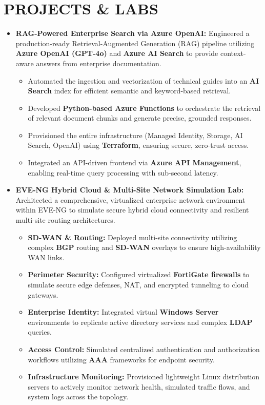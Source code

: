 \documentclass[10pt,a4paper]{article}
\begin{document}
\section*{PROJECTS \& LABS}
\begin{itemize}[label={\color{teal}\textbullet},leftmargin=*,itemsep=3pt,parsep=1pt,topsep=1pt]
    \item \textbf{RAG-Powered Enterprise Search via Azure OpenAI:} Engineered a production-ready Retrieval-Augmented Generation (RAG) pipeline utilizing \textbf{Azure OpenAI (GPT-4o)} and \textbf{Azure AI Search} to provide context-aware answers from enterprise documentation.
    \begin{itemize}[label={--},leftmargin=*,itemsep=1pt,parsep=0pt,topsep=1pt]
        \item Automated the ingestion and vectorization of technical guides into an \textbf{AI Search} index for efficient semantic and keyword-based retrieval.
        \item Developed \textbf{Python-based Azure Functions} to orchestrate the retrieval of relevant document chunks and generate precise, grounded responses.
        \item Provisioned the entire infrastructure (Managed Identity, Storage, AI Search, OpenAI) using \textbf{Terraform}, ensuring secure, zero-trust access.
        \item Integrated an API-driven frontend via \textbf{Azure API Management}, enabling real-time query processing with sub-second latency.
    \end{itemize}
    \item \textbf{EVE-NG Hybrid Cloud \& Multi-Site Network Simulation Lab:} Architected a comprehensive, virtualized enterprise network environment within EVE-NG to simulate secure hybrid cloud connectivity and resilient multi-site routing architectures.
    \begin{itemize}[label={--},leftmargin=*,itemsep=1pt,parsep=0pt,topsep=1pt]
        \item \textbf{SD-WAN \& Routing:} Deployed multi-site connectivity utilizing complex \textbf{BGP} routing and \textbf{SD-WAN} overlays to ensure high-availability WAN links.
        \item \textbf{Perimeter Security:} Configured virtualized \textbf{FortiGate firewalls} to simulate secure edge defenses, NAT, and encrypted tunneling to cloud gateways.
        \item \textbf{Enterprise Identity:} Integrated virtual \textbf{Windows Server} environments to replicate active directory services and complex \textbf{LDAP} queries.
        \item \textbf{Access Control:} Simulated centralized authentication and authorization workflows utilizing \textbf{AAA} frameworks for endpoint security.
        \item \textbf{Infrastructure Monitoring:} Provisioned lightweight Linux distribution servers to actively monitor network health, simulated traffic flows, and system logs across the topology.
    \end{itemize}
\end{itemize}
\end{document}
